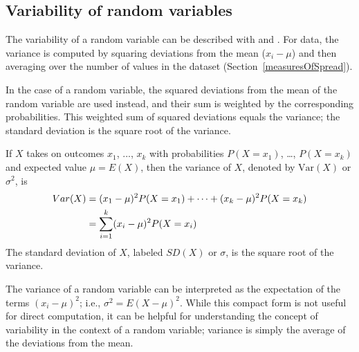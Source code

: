 
\subsection{Variability of random variables}

The variability of a random variable can be described with  and . For data, the variance is computed by squaring deviations from the mean ($x_i - \mu$) and then averaging over the number of values in the dataset (Section~\ref{measuresOfSpread}). 

In the case of a random variable, the squared deviations from the mean of the random variable are used instead, and their sum is weighted by the corresponding probabilities. This weighted sum of squared deviations equals the variance; the standard deviation is the square root of the variance.

\begin{termBox}{
		If $X$ takes on outcomes $x_1$, ..., $x_k$ with probabilities $P(X=x_1)$, \dots, $P(X=x_k)$ and expected value $\mu=E(X)$, then the variance of $X$, denoted by $\text{Var}(X)$ or $\sigma^2$, is
		\begin{align}
		Var(X) &= (x_1-\mu)^2 P(X=x_1) + \cdots \notag + (x_k-\mu)^2 P(X=x_k) \notag \\
		&= \sum_{i=1}^{k} (x_i - \mu)^2 P(X=x_i)
		\end{align}
		The standard deviation of $X$, labeled $SD(X)$ or $\sigma$, is the square root of the variance.}
\end{termBox}

The variance of a random variable can be interpreted as the expectation of the terms $(x_i - \mu)^2$; i.e., $\sigma^2 = E(X - \mu)^2$. While this compact form is not useful for direct computation, it can be helpful for understanding the concept of variability in the context of a random variable; variance is simply the average of the deviations from the mean.


